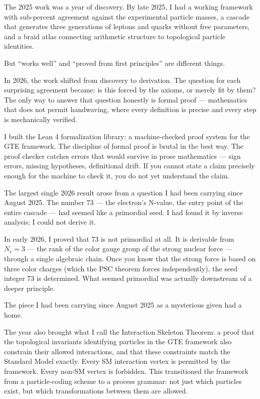 \documentclass[11pt,openany]{book}
\theoremstyle{remark}
\begin{document}
\medskip

The 2025 work was a year of discovery.
By late 2025, I had a working framework with sub-percent agreement against the experimental
particle masses, a cascade that generates three generations of leptons and quarks without
free parameters, and a braid atlas connecting arithmetic structure to topological particle
identities.

But ``works well'' and ``proved from first principles'' are different things.

In 2026, the work shifted from discovery to derivation.
The question for each surprising agreement became: is this forced by the axioms, or merely
fit by them?
The only way to answer that question honestly is formal proof --- mathematics that does not
permit handwaving, where every definition is precise and every step is mechanically verified.

I built the Lean 4 formalization library: a machine-checked proof system for the GTE
framework.
The discipline of formal proof is brutal in the best way.
The proof checker catches errors that would survive in prose mathematics --- sign errors,
missing hypotheses, definitional drift.
If you cannot state a claim precisely enough for the machine to check it, you do not yet
understand the claim.

The largest single 2026 result arose from a question I had been carrying since August 2025.
The number 73 --- the electron's N-value, the entry point of the entire cascade --- had
seemed like a primordial seed.
I had found it by inverse analysis; I could not derive it.

In early 2026, I proved that 73 is not primordial at all.
It is derivable from $N_c = 3$ --- the rank of the color gauge group of the strong nuclear
force --- through a single algebraic chain.
Once you know that the strong force is based on three color charges (which the PSC theorem
forces independently), the seed integer 73 is determined.
What seemed primordial was actually downstream of a deeper principle.

The piece I had been carrying since August 2025 as a mysterious given had a home.

The year also brought what I call the Interaction Skeleton Theorem: a proof that the
topological invariants identifying particles in the GTE framework also constrain their
allowed interactions, and that these constraints match the Standard Model exactly.
Every SM interaction vertex is permitted by the framework.
Every non-SM vertex is forbidden.
This transitioned the framework from a particle-coding scheme to a process grammar: not
just which particles exist, but which transformations between them are allowed.
\end{document}
